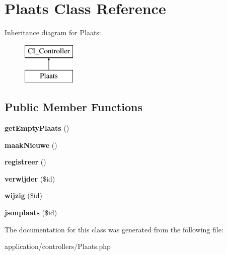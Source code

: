\hypertarget{class_plaats}{}\section{Plaats Class Reference}
\label{class_plaats}
Inheritance diagram for Plaats\+:\begin{figure}[H]
\begin{center}
\leavevmode
\includegraphics[height=2.000000cm]{class_plaats}
\end{center}
\end{figure}
\subsection*{Public Member Functions}
\begin{DoxyCompactItemize}
\item 
\mbox{\label{class_plaats_a3a5c8647f1efcdff577c49894a2bdde8}} 
{\bfseries get\+Empty\+Plaats} ()
\item 
\mbox{\label{class_plaats_a7e7e04e0718668180cf4e8fb0b4dea9b}} 
{\bfseries maak\+Nieuwe} ()
\item 
\mbox{\label{class_plaats_a6db5689af94fb09c1652e5f3b1d2770a}} 
{\bfseries registreer} ()
\item 
\mbox{\label{class_plaats_aa5997c2d1474e374ea50a87e8673d2e4}} 
{\bfseries verwijder} (\$id)
\item 
\mbox{\label{class_plaats_aa10f6589c4f171a54524ed6758bed97f}} 
{\bfseries wijzig} (\$id)
\item 
\mbox{\label{class_plaats_aeac29d4165c8a50a862fe3e8df220376}} 
{\bfseries jsonplaats} (\$id)
\end{DoxyCompactItemize}


The documentation for this class was generated from the following file\+:\begin{DoxyCompactItemize}
\item 
application/controllers/Plaats.\+php\end{DoxyCompactItemize}

